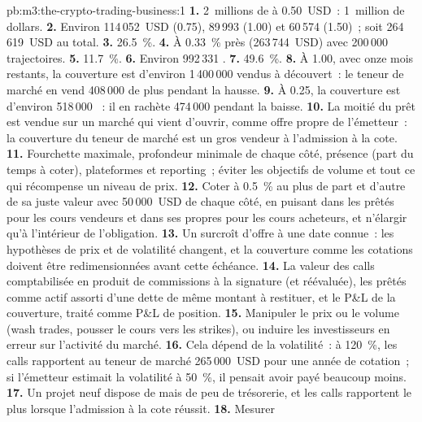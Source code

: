 \begin{solution}{pb:m3:the-crypto-trading-business:1}
\textbf{1.} 2~millions de  à 0.50~USD~: 1~million de dollars. \textbf{2.} Environ 114\,052~USD (0.75), 89\,993 (1.00) et 60\,574 (1.50)~; soit
264\,619~USD au total. \textbf{3.} 26.5~\%. \textbf{4.} À 0.33~\% près (263\,744~USD) avec 200\,000 trajectoires. \textbf{5.} 11.7~\%. \textbf{6.} Environ 992\,331 .
\textbf{7.} 49.6~\%. \textbf{8.} À 1.00, avec onze mois restants, la couverture est d'environ 1\,400\,000  vendus à découvert~: le teneur de marché en vend 408\,000  de plus
pendant la hausse. \textbf{9.} À 0.25, la couverture est d'environ 518\,000 ~: il en rachète 474\,000 pendant la baisse. \textbf{10.} La moitié du prêt est vendue sur un marché qui vient
d'ouvrir, comme offre propre de l'émetteur~: la couverture du teneur de marché est un gros vendeur à l'admission à la cote. \textbf{11.} Fourchette maximale, profondeur minimale de chaque côté, présence
(part du temps à coter), plateformes et reporting~; éviter les objectifs de volume et tout ce qui récompense un niveau de prix. \textbf{12.} Coter à 0.5~\% au plus de part et d'autre de
sa juste valeur avec 50\,000~USD de chaque côté, en puisant dans les  prêtés pour les cours vendeurs et dans ses propres  pour les cours acheteurs, et n'élargir qu'à l'intérieur de
l'obligation. \textbf{13.} Un surcroît d'offre à une date connue~: les hypothèses de prix et de volatilité changent, et la couverture comme les cotations doivent être redimensionnées avant cette échéance.
\textbf{14.} La valeur des calls comptabilisée en produit de commissions à la signature (et réévaluée), les  prêtés comme actif assorti d'une dette de même montant à restituer, et le
P\&L de la couverture, traité comme P\&L de position. \textbf{15.} Manipuler le prix ou le volume (wash trades, pousser le cours vers les strikes), ou induire les investisseurs en erreur sur
l'activité du marché. \textbf{16.} Cela dépend de la volatilité~: à 120~\%, les calls rapportent au teneur de marché 265\,000~USD pour une année de cotation~; si l'émetteur estimait
la volatilité à 50~\%, il pensait avoir payé beaucoup moins. \textbf{17.} Un projet neuf dispose de  mais de peu de trésorerie, et les calls rapportent le plus lorsque l'admission à la cote réussit. \textbf{18.} Mesurer

\end{solution}
